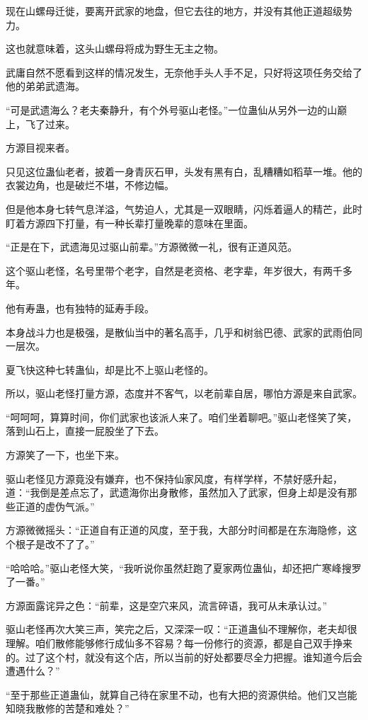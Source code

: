 \begin{this_body}
现在山螺母迁徙，要离开武家的地盘，但它去往的地方，并没有其他正道超级势力。

这也就意味着，这头山螺母将成为野生无主之物。

武庸自然不愿看到这样的情况发生，无奈他手头人手不足，只好将这项任务交给了他的弟弟武遗海。

“可是武遗海么？老夫秦静升，有个外号驱山老怪。”一位蛊仙从另外一边的山巅上，飞了过来。

方源目视来者。

只见这位蛊仙老者，披着一身青灰石甲，头发有黑有白，乱糟糟如稻草一堆。他的衣裳边角，也是破烂不堪，不修边幅。

但是他本身七转气息洋溢，气势迫人，尤其是一双眼睛，闪烁着逼人的精芒，此时盯着方源四下打量，有一种长辈打量晚辈的意味在里面。

“正是在下，武遗海见过驱山前辈。”方源微微一礼，很有正道风范。

这个驱山老怪，名号里带个老字，自然是老资格、老字辈，年岁很大，有两千多年。

他有寿蛊，也有独特的延寿手段。

本身战斗力也是极强，是散仙当中的著名高手，几乎和树翁巴德、武家的武雨伯同一层次。

夏飞快这种七转蛊仙，却是比不上驱山老怪的。

所以，驱山老怪打量方源，态度并不客气，以老前辈自居，哪怕方源是来自武家。

“呵呵呵，算算时间，你们武家也该派人来了。咱们坐着聊吧。”驱山老怪笑了笑，落到山石上，直接一屁股坐了下去。

方源笑了一下，也坐下来。

驱山老怪见方源竟没有嫌弃，也不保持仙家风度，有样学样，不禁好感升起，道：“我倒是差点忘了，武遗海你出身散修，虽然加入了武家，但身上却是没有那些正道的虚伪气派。”

方源微微摇头：“正道自有正道的风度，至于我，大部分时间都是在东海隐修，这个根子是改不了了。”

“哈哈哈。”驱山老怪大笑，“我听说你虽然赶跑了夏家两位蛊仙，却还把广寒峰搜罗了一番。”

方源面露诧异之色：“前辈，这是空穴来风，流言碎语，我可从未承认过。”

驱山老怪再次大笑三声，笑完之后，又深深一叹：“正道蛊仙不理解你，老夫却很理解。咱们散修能够修行成仙多不容易？每一份修行的资源，都是自己双手挣来的。过了这个村，就没有这个店，所以当前的好处都要尽全力把握。谁知道今后会遭遇什么？”

“至于那些正道蛊仙，就算自己待在家里不动，也有大把的资源供给。他们又岂能知晓我散修的苦楚和难处？”


\end{this_body}
